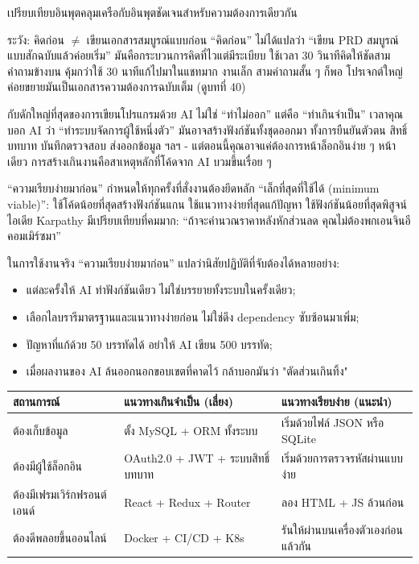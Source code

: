 \begin{center}\small\color{gray}เปรียบเทียบอินพุตคลุมเครือกับอินพุตชัดเจนสำหรับความต้องการเดียวกัน\end{center}

\begin{tcbwarn}{ระวัง: คิดก่อน $\neq$ เขียนเอกสารสมบูรณ์แบบก่อน}
“คิดก่อน” ไม่ได้แปลว่า “เขียน PRD สมบูรณ์แบบสักฉบับแล้วค่อยเริ่ม” มันคือกระบวนการคิดที่ไวแต่มีระเบียบ ใช้เวลา 30 วินาทีคิดให้ชัดสามคำถามข้างบน คุ้มกว่าใช้ 30 นาทีแก้ไปมาในแชทมาก งานเล็ก สามคำถามสั้น ๆ ก็พอ โปรเจกต์ใหญ่ค่อยขยายมันเป็นเอกสารความต้องการฉบับเต็ม (ดูบทที่ 40)

\end{tcbwarn}


กับดักใหญ่ที่สุดของการเขียนโปรแกรมด้วย AI ไม่ใช่ “ทำไม่ออก” แต่คือ “ทำเกินจำเป็น” เวลาคุณบอก AI ว่า “ทำระบบจัดการผู้ใช้หนึ่งตัว” มันอาจสร้างฟังก์ชันทั้งชุดออกมา ทั้งการยืนยันตัวตน สิทธิ์ บทบาท บันทึกตรวจสอบ ส่งออกข้อมูล ฯลฯ - แต่ตอนนี้คุณอาจแค่ต้องการหน้าล็อกอินง่าย ๆ หน้าเดียว การสร้างเกินงานคือสาเหตุหลักที่โค้ดจาก AI บวมขึ้นเรื่อย ๆ

“ความเรียบง่ายมาก่อน” กำหนดให้ทุกครั้งที่สั่งงานต้องยึดหลัก “เล็กที่สุดที่ใช้ได้ (minimum viable)”: ใช้โค้ดน้อยที่สุดสร้างฟังก์ชันแกน ใช้แนวทางง่ายที่สุดแก้ปัญหา ใช้ฟังก์ชันน้อยที่สุดพิสูจน์ไอเดีย Karpathy มีเปรียบเทียบที่คมมาก: “ถ้าจะคำนวณราคาหลังหักส่วนลด คุณไม่ต้องพกเอนจินอีคอมเมิร์ซมา”

ในการใช้งานจริง “ความเรียบง่ายมาก่อน” แปลว่านิสัยปฏิบัติที่จับต้องได้หลายอย่าง:

\begin{itemize}
  \item แต่ละครั้งให้ AI ทำฟังก์ชันเดียว ไม่ใช่บรรยายทั้งระบบในครั้งเดียว;
  \item เลือกไลบรารีมาตรฐานและแนวทางง่ายก่อน ไม่ใช่ดึง dependency ซับซ้อนมาเพิ่ม;
  \item ปัญหาที่แก้ด้วย 50 บรรทัดได้ อย่าให้ AI เขียน 500 บรรทัด;
  \item เมื่อผลงานของ AI ล้นออกนอกขอบเขตที่คาดไว้ กล้าบอกมันว่า "ตัดส่วนเกินทิ้ง"
\end{itemize}

\begin{center}
\begin{tabularx}{\linewidth}{|X|X|X|}
\hline
\textbf{สถานการณ์} & \textbf{แนวทางเกินจำเป็น (เลี่ยง)} & \textbf{แนวทางเรียบง่าย (แนะนำ)} \tabularnewline
\hline
ต้องเก็บข้อมูล & ตั้ง MySQL + ORM ทั้งระบบ & เริ่มด้วยไฟล์ JSON หรือ SQLite \tabularnewline
ต้องมีผู้ใช้ล็อกอิน & OAuth2.0 + JWT + ระบบสิทธิ์บทบาท & เริ่มด้วยการตรวจรหัสผ่านแบบง่าย \tabularnewline
ต้องมีเฟรมเวิร์กฟรอนต์เอนด์ & React + Redux + Router & ลอง HTML + JS ล้วนก่อน \tabularnewline
ต้องดีพลอยขึ้นออนไลน์ & Docker + CI/CD + K8s & รันให้ผ่านบนเครื่องตัวเองก่อนแล้วกัน \tabularnewline
\hline
\end{tabularx}
\end{center}


